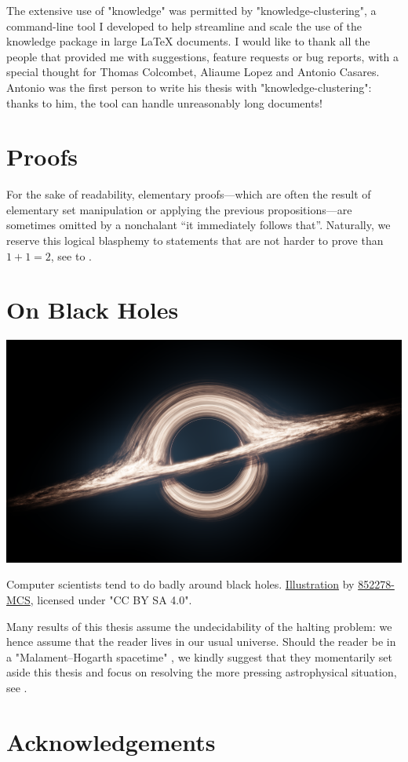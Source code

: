 The extensive use of "knowledge" was permitted by "knowledge-clustering",
a command-line tool I developed to help streamline and scale the use
of the knowledge package in large LaTeX documents.
I would like to thank all the people that provided me with suggestions,
feature requests or bug reports, with a special thought for Thomas Colcombet, Aliaume Lopez
and Antonio Casares. Antonio was the first person to write his thesis
with "knowledge-clustering": thanks to him, the tool can handle
unreasonably long documents!

\section*{Proofs}

For the sake of readability, elementary
proofs---which are often the result of elementary set manipulation or applying
the previous propositions---are sometimes omitted by a nonchalant
``it immediately follows that''.
Naturally, we reserve this logical blasphemy to
statements that are not harder to prove than $1+1 = 2$,
see \cite[$\ast$ 54.43]{WhiteheadRussell1910PM1} to \cite[$\ast$ 110.643]{WhiteheadRussell1912PM2}.

\section*{On Black Holes}

\begin{marginfigure}
	\centering
	\includegraphics[width=\linewidth]{fig/intro/black-hole.png}
	\caption{
		\AP\label{fig:preface-black-hole}
		Computer scientists tend to do badly around black holes.
		\href{https://commons.wikimedia.org/wiki/File:Black_Hole_Full.png}{Illustration}
		by \href{https://commons.wikimedia.org/wiki/User:852278-MCS}{852278-MCS},
		licensed under "CC BY SA 4.0".
	}
\end{marginfigure}
Many results of this thesis assume the undecidability of the halting problem:
we hence assume that the reader lives in our usual universe.
Should the reader be in a "Malament–Hogarth spacetime" \cite{Hogarth1994NonTuring},
we kindly suggest that
they momentarily set aside this thesis and focus on resolving the more pressing
astrophysical situation, see .

\section*{Acknowledgements}

